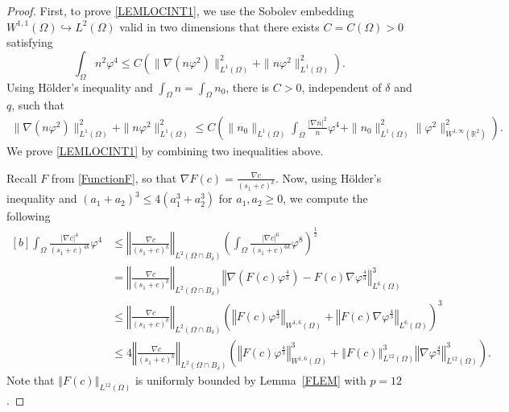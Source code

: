 \documentclass{amsart}
\numberwithin{equation}{section}
\newcommand{\R}{{ \mathbb{R}  }}
\newcommand{\bke}[1]{\left( #1 \right)}
\newcommand{\norm}[1]{\left\Vert #1 \right\Vert}
\begin{document}
\begin{proof}
First, to prove \eqref{LEMLOCINT1}, we use the Sobolev embedding $W^{1, 1}(\Omega)\hookrightarrow L^{2}(\Omega)$ valid in two dimensions that there exists $C=C(\Omega)>0$ satisfying
\[
 \int_{\Omega}n^{2}\varphi^{4}   \le C\bke{ \|\nabla(n\varphi^{2})\|_{L^{1}(\Omega)}^{2}+\|n\varphi^{2}\|_{L^{1}(\Omega)}^{2}}.
\]
Using   H\"older's inequality and  $\int_{\Omega}n=\int_{\Omega}n_{0}$, there is $C>0$, independent of $\delta$ and $q$, such that 
\[
\begin{aligned}
 \|\nabla(n\varphi^{2})\|_{L^{1}(\Omega)}^{2} +\|n\varphi^{2}\|_{L^{1}(\Omega)}^{2}
\le C\bke{ \|n_{0}\|_{L^{1}(\Omega)}  \int_{\Omega} \frac{|\nabla n|^{2}}{n}\varphi^{4} +\|n_{0}\|_{L^{1}(\Omega)}^{2}\| \varphi^{2}  \|_{W^{1,\infty}(\R^{2})}^{2} }.
 \end{aligned}
\]
We prove \eqref{LEMLOCINT1} by combining two inequalities above.

Recall $F$ from \eqref{FunctionF}, so that $\nabla F(c)=\frac{\nabla c}{(s_1+c)^k}$.
Now, using  H\"older's  inequality and $(a_{1}+a_{2})^{3}\le 4(a_{1}^{3}+a_{2}^{3})$ for $a_{1},a_{2}\ge0$,  we compute the following 
\begin{equation}\label{LEM5_1}
\begin{aligned}[b]
 \int_{\Omega}\frac{|\nabla c|^{4}}{(s_{1}+c)^{4k}}\varphi^{4}
&\le   \norm{\frac{\nabla c}{(s_{1}+c)^{k}}}_{L^{2}(\Omega\cap B_{\delta})}\bke{\int_{\Omega}\frac{|\nabla c|^{6}}{(s_{1}+c)^{6k}}\varphi^{8}}^{\frac{1}{2}}\\
 &= \norm{\frac{\nabla c}{(s_{1}+c)^{k}}}_{L^{2}(\Omega\cap B_{\delta})}\norm{ \nabla (F(c)\varphi^{\frac{4}{3}})- F(c) \nabla \varphi^{\frac{4}{3}} }_{L^{6}(\Omega)}^{3}
\\
 &\le   \norm{\frac{\nabla c}{(s_{1}+c)^{k}}}_{L^{2}(\Omega\cap B_{\delta})}\bke{\norm{  F(c)  \varphi^{\frac{4}{3}}}_{W^{1,6}(\Omega)} + \norm{F(c)\nabla \varphi^{\frac{4}{3}}}_{L^{6}(\Omega)}}^{3}
\\
& \le  4\norm{\frac{\nabla c}{(s_{1}+c)^{k}}}_{L^{2}(\Omega\cap B_{\delta})} \bke{\norm{  F(c)  \varphi^{\frac{4}{3}}}_{W^{1,6}(\Omega)}^{3}+  \norm{ F(c)}_{L^{12}(\Omega)}^{3}\norm{ \nabla \varphi^{\frac{4}{3}}}_{L^{12}(\Omega)}^{3}}.
\end{aligned}
\end{equation}
Note that $\norm{ F(c)}_{L^{12}(\Omega)}$ is uniformly bounded by Lemma~\ref{FLEM} with $p=12$.


\end{proof}
\end{document}
